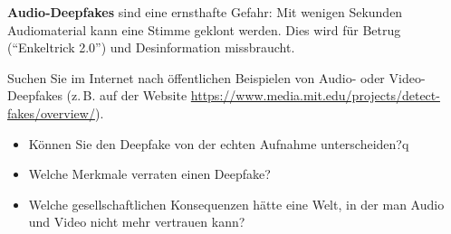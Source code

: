 \begin{myremark}
\textbf{Audio-Deepfakes} sind eine ernsthafte Gefahr: Mit wenigen Sekunden
Audiomaterial kann eine Stimme geklont werden. Dies wird für Betrug
(\enquote{Enkeltrick 2.0}) und Desinformation missbraucht.
\end{myremark}

\begin{myexercise}
Suchen Sie im Internet nach öffentlichen Beispielen von Audio- oder Video-Deepfakes
(z.\,B. auf der Website \url{https://www.media.mit.edu/projects/detect-fakes/overview/}).

\begin{itemize}
    \item Können Sie den Deepfake von der echten Aufnahme unterscheiden?q
    \item Welche Merkmale verraten einen Deepfake?
    \item Welche gesellschaftlichen Konsequenzen hätte eine Welt, in der
          man Audio und Video nicht mehr vertrauen kann?
\end{itemize}
\end{myexercise}
